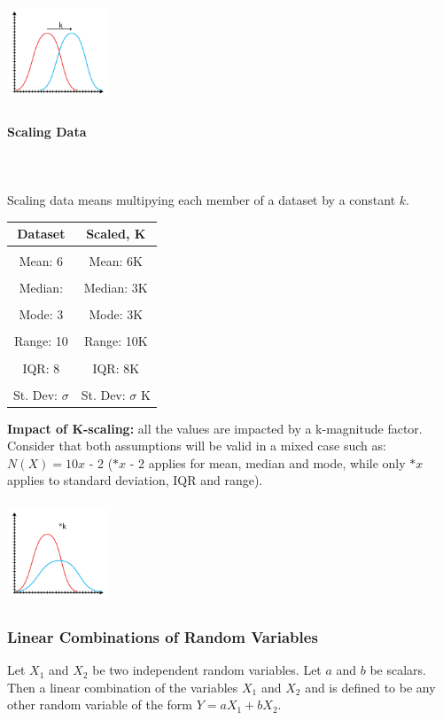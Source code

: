 \documentclass{article}
\begin{document}
\includegraphics[width=3cm, height=3cm]{shifted}

\paragraph{Scaling Data}\mbox{} \\
\mbox{} \\
Scaling data means multipying each member of a dataset by a constant $k$.
\begin{center}
\begin{tabular}{|c|c|}
\hline
Dataset & Scaled, K\\ \hline
&\\[-1em]
Mean: 6 & Mean: 6K \\ \hline
&\\[-1em]
Median:  & Median: 3K \\ \hline
&\\[-1em]
Mode: 3 & Mode: 3K  \\ \hline
&\\[-1em]
Range: 10 & Range: 10K \\ \hline
&\\[-1em]
IQR: 8 & IQR: 8K \\ \hline
&\\[-1em]
St. Dev: $\sigma$ & St. Dev: $\sigma$ K \\
\hline
\end{tabular}
\end{center}
\textbf{Impact of K-scaling:} all the values are impacted by a k-magnitude factor.
Consider that both assumptions will be valid in a mixed case such as: 
$N(X) = 10x$ - 2 ($*x$ - 2 applies for mean, median and mode, while only $*x$ applies to standard deviation, IQR and range).

\includegraphics[width=3cm, height=3cm]{scaled}

\subsubsection{Linear Combinations of Random Variables}
Let $X_1$ and $X_2$ be two independent random variables. Let $a$ and $b$ be scalars. Then a linear combination of the variables $X_1$ and $X_2$ and is defined to be any other random variable of the form $Y= aX_1 + bX_2$. 
\end{document}
